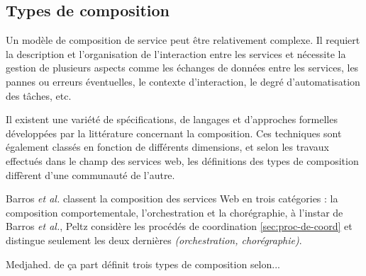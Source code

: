     \subsection{Types de composition}

    \label{sec:types-de-composition}
    Un modèle de composition de service peut être relativement
    complexe. Il requiert la description et l'organisation de
    l'interaction entre les services et nécessite la gestion de
    plusieurs aspects comme les échanges de données entre les
    services, les pannes ou erreurs éventuelles, le contexte
    d'interaction, le degré d'automatisation des tâches, etc.
    
    Il existent une variété de spécifications, de langages et
    d'approches formelles développées par la littérature concernant la
    composition. Ces techniques sont également classés en fonction de
    différents dimensions, et selon les travaux effectués dans le
    champ des services web, les définitions des types de composition
    diffèrent d'une communauté de l'autre.

    Barros \emph{et al.} \cite{barros2006standards} classent la
    composition des services Web en trois catégories : la composition
    comportementale, l'orchestration et la chorégraphie, à l'instar de
    Barros \emph{et al.}, Peltz \cite{peltz2003web} considère les
    procédés de coordination \ref{sec:proc-de-coord} et distingue
    seulement les deux dernières \textit{(orchestration,
      chorégraphie)}.
  


    Medjahed.\cite{medjahed2004thesis} de ça part définit trois types
    de composition selon...

